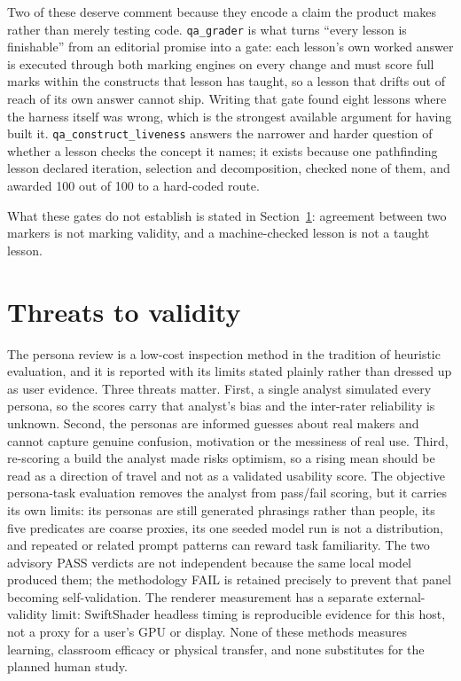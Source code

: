 \documentclass[11pt,a4paper]{report}
\begin{document}
Two of these deserve comment because they encode a claim the product makes rather than merely testing code. \texttt{qa\_grader} is what turns ``every lesson is finishable'' from an editorial promise into a gate: each lesson's own worked answer is executed through both marking engines on every change and must score full marks within the constructs that lesson has taught, so a lesson that drifts out of reach of its own answer cannot ship. Writing that gate found eight lessons where the harness itself was wrong, which is the strongest available argument for having built it. \texttt{qa\_construct\_liveness} answers the narrower and harder question of whether a lesson checks the concept it names; it exists because one pathfinding lesson declared iteration, selection and decomposition, checked none of them, and awarded 100 out of 100 to a hard-coded route.

What these gates do not establish is stated in Section~\ref{sec:threats}: agreement between two markers is not marking validity, and a machine-checked lesson is not a taught lesson.

\section{Threats to validity}
\label{sec:threats}
The persona review is a low-cost inspection method in the tradition of heuristic evaluation, and it is reported with its limits stated plainly rather than dressed up as user evidence. Three threats matter. First, a single analyst simulated every persona, so the scores carry that analyst's bias and the inter-rater reliability is unknown. Second, the personas are informed guesses about real makers and cannot capture genuine confusion, motivation or the messiness of real use. Third, re-scoring a build the analyst made risks optimism, so a rising mean should be read as a direction of travel and not as a validated usability score. The objective persona-task evaluation removes the analyst from pass/fail scoring, but it carries its own limits: its personas are still generated phrasings rather than people, its five predicates are coarse proxies, its one seeded model run is not a distribution, and repeated or related prompt patterns can reward task familiarity. The two advisory PASS verdicts are not independent because the same local model produced them; the methodology FAIL is retained precisely to prevent that panel becoming self-validation. The renderer measurement has a separate external-validity limit: SwiftShader headless timing is reproducible evidence for this host, not a proxy for a user's GPU or display. None of these methods measures learning, classroom efficacy or physical transfer, and none substitutes for the planned human study.
\end{document}
